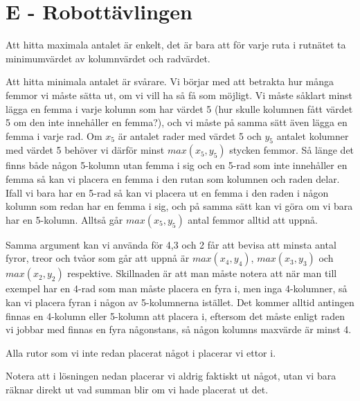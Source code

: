 \section*{E - Robottävlingen}
Att hitta maximala antalet är enkelt, det är bara att för varje ruta i rutnätet ta minimumvärdet av kolumnvärdet och radvärdet.

Att hitta minimala antalet är svårare. Vi börjar med att betrakta hur många femmor vi måste sätta ut, om vi vill ha så få som möjligt.
Vi måste såklart minst lägga en femma i varje kolumn som har värdet 5 (hur skulle kolumnen fått värdet 5 om den inte innehåller en femma?),
och vi måste på samma sätt även lägga en femma i varje rad.
Om $x_5$ är antalet rader med värdet 5 och $y_5$ antalet kolumner med värdet 5 behöver vi därför minst $max(x_5,y_5)$ stycken femmor.
Så länge det finns både någon 5-kolumn utan femma i sig och en 5-rad som inte innehåller en femma så kan vi placera en femma i den rutan som 
kolumnen och raden delar. Ifall vi bara har en 5-rad så kan vi placera ut en femma i den raden i någon kolumn som redan har en femma i sig,
och på samma sätt kan vi göra om vi bara har en 5-kolumn. Alltså går $max(x_5,y_5)$ antal femmor alltid att uppnå.

Samma argument kan vi använda för 4,3 och 2 får att bevisa att minsta antal fyror, treor och tvåor som går att uppnå är $max(x_4,y_4)$, $max(x_3,y_3)$ och $max(x_2,y_2)$ respektive.
Skillnaden är att man måste notera att när man till exempel har en 4-rad som man måste placera en fyra i, men inga 4-kolumner,
så kan vi placera fyran i någon av 5-kolumnerna istället. Det kommer alltid antingen finnas en 4-kolumn eller 5-kolumn att placera i,
eftersom det måste enligt raden vi jobbar med finnas en fyra någonstans, så någon kolumns maxvärde är minst 4.

Alla rutor som vi inte redan placerat något i placerar vi ettor i.

Notera att i lösningen nedan placerar vi aldrig faktiskt ut något, utan vi bara räknar direkt ut vad summan blir om vi hade placerat ut det.

